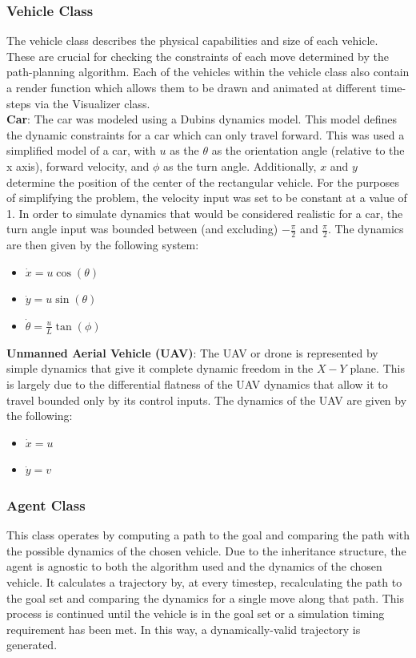 \documentclass[10pt,letterpaper]{article}
\begin{document}
\subsubsection*{Vehicle Class}
The vehicle class describes the physical capabilities and size of each vehicle. These are crucial for checking the constraints of each move determined by the path-planning algorithm. Each of the vehicles within the vehicle class also contain a render function which allows them to be drawn and animated at different time-steps via the Visualizer class. \\

\noindent \textbf{Car}: The car was modeled using a Dubins dynamics model. This model defines the dynamic constraints for a car which can only travel forward. This was used a simplified model of a car, with $u$ as the $\theta$ as the orientation angle (relative to the x axis), forward velocity, and $\phi$ as the turn angle. Additionally, $x$ and $y$ determine the position of the center of the rectangular vehicle. For the purposes of simplifying the problem, the velocity input was set to be constant at a value of 1. In order to simulate dynamics that would be considered realistic for a car, the turn angle input was bounded between (and excluding) $-\frac{\pi}{2}$ and $\frac{\pi}{2}$. The dynamics are then given by the following system: 

\begin{itemize}
    \item {$\dot x = u \cos(\theta)$}
    \item {$\dot y = u \sin(\theta)$}
    \item {$\dot \theta = \frac{u}{L} \tan(\phi)$}
\end{itemize}

\noindent \textbf{Unmanned Aerial Vehicle (UAV)}: The UAV or drone is represented by simple dynamics that give it complete dynamic freedom in the $X-Y$ plane. This is largely due to the differential flatness of the UAV dynamics that allow it to travel bounded only by its control inputs. The dynamics of the UAV are given by the following:

\begin{itemize}
    \item{$\dot x = u$}
    \item{$\dot y = v$}
\end{itemize}


\subsubsection*{Agent Class}
This class operates by computing a path to the goal and comparing the path with the possible dynamics of the chosen vehicle. Due to the inheritance structure, the agent is agnostic to both the algorithm used and the dynamics of the chosen vehicle. It calculates a trajectory by, at every timestep, recalculating the path to the goal set and comparing the dynamics for a single move along that path. This process is continued until the vehicle is in the goal set or a simulation timing requirement has been met. In this way, a dynamically-valid trajectory is generated.
\end{document}
